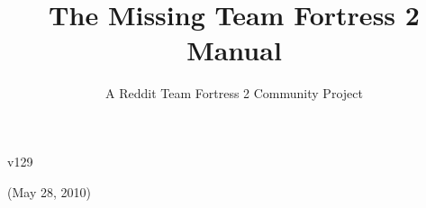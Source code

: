 \documentclass[letterpaper,12pt]{article}
\title{The Missing Team Fortress 2 Manual}
\author{A Reddit Team Fortress 2 Community Project}
\date{}
\begin{document}
\maketitle

\vspace{155 mm}
\begin{center}v129 \end{center}

\begin{center}(May 28, 2010) \end{center}



\thispagestyle{empty}
\newpage
\pagestyle{headings}
\setcounter{page}{1}

\tableofcontents


\newpage
\setcounter{page}{1}



\newpage



\newpage


\newpage


\newpage


\newpage


\newpage


\newpage

\end{document}
